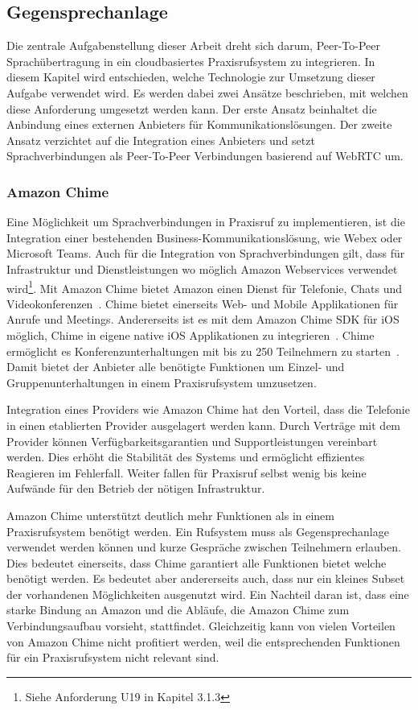 \subsection{Gegensprechanlage}

Die zentrale Aufgabenstellung dieser Arbeit dreht sich darum, Peer-To-Peer Sprachübertragung in ein cloudbasiertes Praxisrufsystem zu integrieren.
In diesem Kapitel wird entschieden, welche Technologie zur Umsetzung dieser Aufgabe verwendet wird.
Es werden dabei zwei Ansätze beschrieben, mit welchen diese Anforderung umgesetzt werden kann.
Der erste Ansatz beinhaltet die Anbindung eines externen Anbieters für Kommunikationslösungen.
Der zweite Ansatz verzichtet auf die Integration eines Anbieters und setzt Sprachverbindungen als Peer-To-Peer Verbindungen basierend auf WebRTC um.

\subsubsection{Amazon Chime}

Eine Möglichkeit um Sprachverbindungen in Praxisruf zu implementieren, ist die Integration einer bestehenden Business-Kommunikationslösung, wie Webex oder Microsoft Teams.
Auch für die Integration von Sprachverbindungen gilt, dass für Infrastruktur und Dienstleistungen wo möglich Amazon Webservices verwendet wird\footnote{Siehe Anforderung U19 in Kapitel 3.1.3}.
Mit Amazon Chime bietet Amazon einen Dienst für Telefonie, Chats und Videokonferenzen~\cite{aws_chime}.
Chime bietet einerseits Web- und Mobile Applikationen für Anrufe und Meetings.
Andererseits ist es mit dem Amazon Chime SDK für iOS möglich, Chime in eigene native iOS Applikationen zu integrieren~\cite{aws_chime_sdk}.
Chime ermöglicht es Konferenzunterhaltungen mit bis zu 250 Teilnehmern zu starten~\cite{aws_faq}.
Damit bietet der Anbieter alle benötigte Funktionen um Einzel- und Gruppenunterhaltungen in einem Praxisrufsystem umzusetzen.

Integration eines Providers wie Amazon Chime hat den Vorteil, dass die Telefonie in einen etablierten Provider ausgelagert werden kann.
Durch Verträge mit dem Provider können Verfügbarkeitsgarantien und Supportleistungen vereinbart werden.
Dies erhöht die Stabilität des Systems und ermöglicht effizientes Reagieren im Fehlerfall.
Weiter fallen für Praxisruf selbst wenig bis keine Aufwände für den Betrieb der nötigen Infrastruktur.

Amazon Chime unterstützt deutlich mehr Funktionen als in einem Praxisrufsystem benötigt werden.
Ein Rufsystem muss als Gegensprechanlage verwendet werden können und kurze Gespräche zwischen Teilnehmern erlauben.
Dies bedeutet einerseits, dass Chime garantiert alle Funktionen bietet welche benötigt werden.
Es bedeutet aber andererseits auch, dass nur ein kleines Subset der vorhandenen Möglichkeiten ausgenutzt wird.
Ein Nachteil daran ist, dass eine starke Bindung an Amazon und die Abläufe, die Amazon Chime zum Verbindungsaufbau vorsieht, stattfindet.
Gleichzeitig kann von vielen Vorteilen von Amazon Chime nicht profitiert werden, weil die entsprechenden Funktionen für ein Praxisrufsystem nicht relevant sind.

